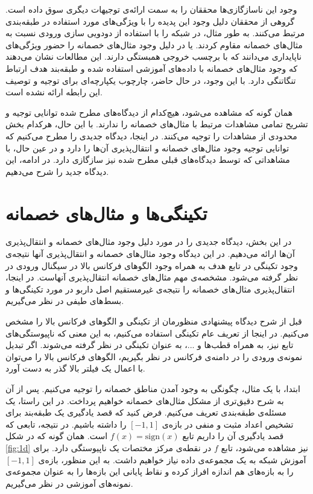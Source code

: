 \documentclass[12pt,onecolumn,a4paper]{article}
\begin{document}
وجود این ناسازگازی‌ها محققان را به سمت ارائه‌ی توجیهات دیگری سوق داده است. گروهی از محققان دلیل وجود این پدیده را با ویژگی‌های مورد استفاده در طبقه‌بندی مرتبط می‌کنند. به طور مثال، در \cite{eykholt2019robust} شبکه را با استفاده از دودویی سازی ورودی نسبت به مثال‌های خصمانه مقاوم کردند. یا در \cite{ilyas2019adversarial} دلیل وجود مثال‌های خصمانه را حضور ویژگی‌های ناپایداری می‌دانند که با برچسب خروجی همبستگی دارند. این مطالعات نشان می‌دهند که وجود مثال‌های خصمانه با داده‌های آموزشی استفاده شده و طبقه‌بند هدف ارتباط تنگاتنگی دارد. با این وجود، در حال حاضر، چارچوب یکپارچه‌ای برای توجیه و توصیف این رابطه ارائه نشده است.

همان گونه که مشاهده می‌شود، هیچ‌کدام از دیدگاه‌های مطرح شده توانایی توجیه و تشریح تمامی مشاهدات مرتبط با مثال‌های خصمانه را ندارند. با این حال، هرکدام بخش محدودی از مشاهدات را توجیه می‌کنند. در اینجا، دیدگاه جدیدی را مطرح می‌کنیم که توانایی توجیه وجود مثال‌های خصمانه و انتقال‌پذیری آن‌ها را دارد و  در عین حال، با مشاهداتی که توسط دیدگاه‌های قبلی مطرح شده نیز سازگازی دارد. در ادامه، این دیدگاه جدید را شرح می‌دهیم.

\section{تکینگی‌ها و مثال‌های خصمانه}
در این بخش، دیدگاه جدیدی را در مورد دلیل وجود مثال‌های خصمانه و انتقال‌پذیری آن‌ها ارائه می‌دهیم. در این دیدگاه وجود مثال‌های خصمانه و انتقال‌پذیری آنها نتیجه‌ی وجود تکینگی در تابع هدف به همراه وجود الگوهای فرکانس بالا در سیگنال ورودی در نظر گرفته می‌شود. مشخصه‌ی مهم مثال‌های خصمانه انتقال‌پذیری آنهاست. در اینجا، انتقال‌پذیری مثال‌های خصمانه را نتیجه‌ی غیرمستقیم اصل داربو در مورد تکینگی‌ها و بسط‌های طیفی در نظر می‌گیریم.

قبل از شرح دیدگاه پیشنهادی منظورمان از تکینگی و الگوهای فرکانس بالا را مشخص می‌کنیم. در اینجا از تعریف عام تکینگی استفاده می‌کنیم، به این معنی که ناپیوستگی‌های تابع نیز، به همراه قطب‌ها و ...، به عنوان تکینگی  در نظر گرفته می‌شوند. اگر تبدیل نمونه‌ی ورودی را در دامنه‌ی فرکانس در نظر بگیریم، الگوهای فرکانس بالا را می‌توان با اعمال یک  فیلتر بالا گذر به دست آورد.

ابتدا، با یک مثال، چگونگی به وجود آمدن مناطق خصمانه را توجیه می‌کنیم. پس از آن به شرح دقیق‌تری از مشکل مثال‌های خصمانه خواهیم پرداخت. در این راستا، یک مسئله‌ی طبقه‌بندی تعریف می‌کنیم. فرض کنید که قصد یادگیری یک طبقه‌بند برای تشخیص اعداد مثبت و منفی در بازه‌ی 
$[-1,1]$ 
را داشته باشیم. در نتیجه، تابعی که قصد یادگیری آن را داریم تابع 
$f(x)=\mathrm{sign}(x)$ 
است. همان گونه که در شکل \ref{fig:1d} نیز مشاهده می‌شود، تابع 
$f$ 
در نقطه‌ی مرکز مختصات یک ناپیوستگی دارد. برای آموزش شبکه به یک مجموعه‌ی داده نیاز خواهیم داشت. به این منظور، بازه‌ی 
$[-1,1]$ 
را به بازه‌های هم اندازه افراز کرده و نقاط پایانی این بازه‌ها را به عنوان مجموعه‌ی نمونه‌های آموزشی در نظر می‌گیریم.
\end{document}
